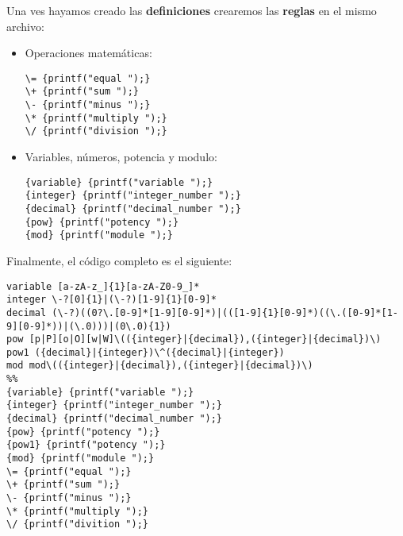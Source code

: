 Una ves hayamos creado las \textbf{definiciones} crearemos las \textbf{reglas} en el mismo archivo:

\begin{itemize}
\item Operaciones matemáticas:
\begin{lstlisting}
\= {printf("equal ");}
\+ {printf("sum ");}
\- {printf("minus ");}
\* {printf("multiply ");}
\/ {printf("division ");}
\end{lstlisting}
\item Variables, números, potencia y modulo:
\begin{lstlisting}
{variable} {printf("variable ");}
{integer} {printf("integer_number ");}
{decimal} {printf("decimal_number ");}
{pow} {printf("potency ");}
{mod} {printf("module ");}
\end{lstlisting}
\end{itemize}

\pagebreak

Finalmente, el código completo es el siguiente:

\begin{lstlisting}
variable [a-zA-z_]{1}[a-zA-Z0-9_]*
integer \-?[0]{1}|(\-?)[1-9]{1}[0-9]*
decimal (\-?)((0?\.[0-9]*[1-9][0-9]*)|(([1-9]{1}[0-9]*)((\.([0-9]*[1-9][0-9]*))|(\.0)))|(0\.0){1})
pow [p|P][o|O][w|W]\(({integer}|{decimal}),({integer}|{decimal})\)
pow1 ({decimal}|{integer})\^({decimal}|{integer})
mod mod\(({integer}|{decimal}),({integer}|{decimal})\)
%%
{variable} {printf("variable ");}
{integer} {printf("integer_number ");}
{decimal} {printf("decimal_number ");}
{pow} {printf("potency ");}
{pow1} {printf("potency ");}
{mod} {printf("module ");}
\= {printf("equal ");}
\+ {printf("sum ");}
\- {printf("minus ");}
\* {printf("multiply ");}
\/ {printf("divition ");}
\end{lstlisting}

\pagebreak